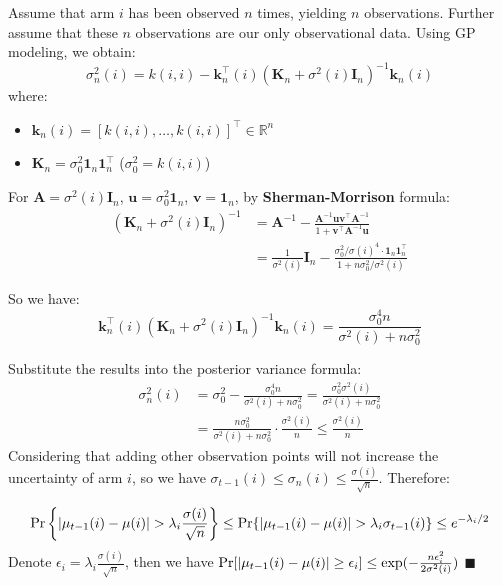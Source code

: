 \documentclass[opre,sglanonrev]{informs4}
\begin{document}
Assume that arm $i$ has been observed $n$ times, yielding $n$ observations. Further assume that these $n$ observations are our only observational data. Using GP modeling, we obtain:
\[
\sigma_n^2(i) = k(i,i) - \mathbf{k}_n^\top(i)(\mathbf{K}_n + \sigma^2(i)\mathbf{I}_n)^{-1}\mathbf{k}_n(i)
\]
where:
\begin{itemize}
    \item $\mathbf{k}_n(i) = [k(i,i),\dots,k(i,i)]^\top \in \mathbb{R}^n$
    \item $\mathbf{K}_n = \sigma_0^2\mathbf{1}_n\mathbf{1}_n^\top$ ($\sigma_0^2 = k(i,i)$)
\end{itemize} %

For $\mathbf{A} = \sigma^2(i)\mathbf{I}_n$, $\mathbf{u} = \sigma_0^2\mathbf{1}_n$, $\mathbf{v} = \mathbf{1}_n$, by \textbf{Sherman-Morrison} formula:
\begin{equation*}
\begin{aligned}
(\mathbf{K}_n + \sigma^2(i)\mathbf{I}_n)^{-1} &= \mathbf{A}^{-1} - \frac{\mathbf{A}^{-1}\mathbf{u}\mathbf{v}^\top\mathbf{A}^{-1}}{1 + \mathbf{v}^\top\mathbf{A}^{-1}\mathbf{u}} \\
&= \frac{1}{\sigma^2(i)}\mathbf{I}_n - \frac{\sigma_0^2/\sigma(i)^4 \cdot \mathbf{1}_n\mathbf{1}_n^\top}{1 + n\sigma_0^2/\sigma^2(i)}
\end{aligned}
\end{equation*} 

So we have:
\[
\mathbf{k}_n^\top(i)(\mathbf{K}_n + \sigma^2(i)\mathbf{I}_n)^{-1}\mathbf{k}_n(i) = \frac{\sigma_0^4n}{\sigma^2(i) + n\sigma_0^2}
\]

Substitute the results into the posterior variance formula:
\begin{equation*}
\begin{aligned}
\sigma_n^2(i) &= \sigma_0^2 - \frac{\sigma_0^4n}{\sigma^2(i) + n\sigma_0^2} = \frac{\sigma_0^2\sigma^2(i)}{\sigma^2(i) + n\sigma_0^2} \\
&= \frac{n\sigma_0^2}{\sigma^2(i)+n\sigma_0^2}\cdot \frac{\sigma^2(i)}{n} \leq \frac{\sigma^2(i)}{n}
\end{aligned}
\end{equation*} 
Considering that adding other observation points will not increase the uncertainty of arm $i$, so we have $\sigma_{t-1}(i) \leq \sigma_n(i) \leq \frac{\sigma(i)}{\sqrt{n}}$. Therefore:

$$\textnormal{Pr}\left\{|\mu_{t-1}(i)-\mu(i)|>\lambda_i \frac{\sigma(i)}{\sqrt{n}}\right\}\leq\textnormal{Pr}\{|\mu_{t-1}(i)-\mu(i)|>\lambda_i \sigma_{t-1}(i)\}\leq e^{-\lambda_i/2}$$
Denote $\epsilon_i = \lambda_i \frac{\sigma(i)}{\sqrt{n}}$, then we have $\textnormal{Pr}[|\mu_{t-1}(i)-\mu(i)|\geq \epsilon_i]\leq \exp(-\frac{n\epsilon_i^2}{2\sigma^2(i)})$  \hfill $\blacksquare$
\end{document}

